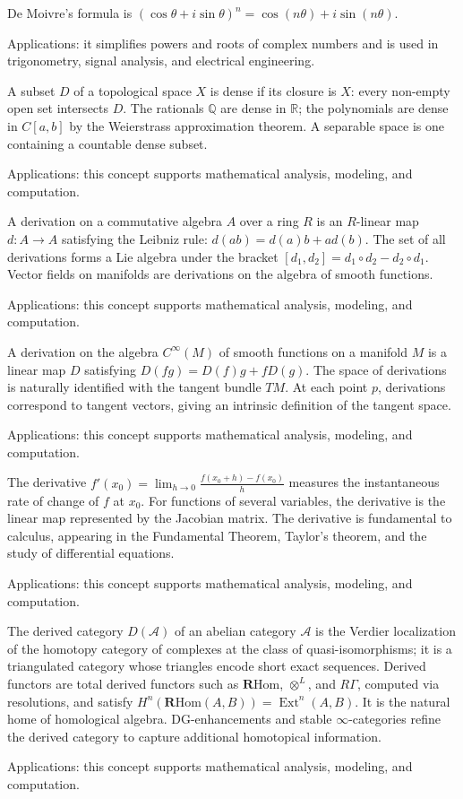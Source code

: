 De Moivre's formula is $(\cos\theta+i\sin\theta)^n=\cos(n\theta)+i\sin(n\theta)$. \par\noindent Applications: it simplifies powers and roots of complex numbers and is used in trigonometry, signal analysis, and electrical engineering.

A subset $D$ of a topological space $X$ is dense if its closure is $X$: every non-empty open set intersects $D$. The rationals $\mathbb{Q}$ are dense in $\mathbb{R}$; the polynomials are dense in $C[a,b]$ by the Weierstrass approximation theorem. A separable space is one containing a countable dense subset. \par\noindent Applications: this concept supports mathematical analysis, modeling, and computation.

A derivation on a commutative algebra $A$ over a ring $R$ is an $R$-linear map $d: A \to A$ satisfying the Leibniz rule: $d(ab) = d(a)b + ad(b)$. The set of all derivations forms a Lie algebra under the bracket $[d_1, d_2] = d_1 \circ d_2 - d_2 \circ d_1$. Vector fields on manifolds are derivations on the algebra of smooth functions. \par\noindent Applications: this concept supports mathematical analysis, modeling, and computation.

A derivation on the algebra $C^\infty(M)$ of smooth functions on a manifold $M$ is a linear map $D$ satisfying $D(fg) = D(f)g + fD(g)$. The space of derivations is naturally identified with the tangent bundle $TM$. At each point $p$, derivations correspond to tangent vectors, giving an intrinsic definition of the tangent space. \par\noindent Applications: this concept supports mathematical analysis, modeling, and computation.

The derivative $f'(x_0) = \lim_{h \to 0} \frac{f(x_0+h) - f(x_0)}{h}$ measures the instantaneous rate of change of $f$ at $x_0$. For functions of several variables, the derivative is the linear map represented by the Jacobian matrix. The derivative is fundamental to calculus, appearing in the Fundamental Theorem, Taylor's theorem, and the study of differential equations. \par\noindent Applications: this concept supports mathematical analysis, modeling, and computation.

The derived category $D(\mathcal{A})$ of an abelian category $\mathcal{A}$ is the Verdier localization of the homotopy category of complexes at the class of quasi-isomorphisms; it is a triangulated category whose triangles encode short exact sequences. Derived functors are total derived functors such as $\mathbf{R}\mathrm{Hom}$, $\otimes^L$, and $R\Gamma$, computed via resolutions, and satisfy $H^n(\mathbf{R}\mathrm{Hom}(A,B)) = \operatorname{Ext}^n(A,B)$. It is the natural home of homological algebra. DG-enhancements and stable $\infty$-categories refine the derived category to capture additional homotopical information. \par\noindent Applications: this concept supports mathematical analysis, modeling, and computation.

